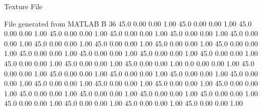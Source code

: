 Texture File

File generated from MATLAB
B 36
   45.0   0.00   0.00  1.00
   45.0   0.00   0.00  1.00
   45.0   0.00   0.00  1.00
   45.0   0.00   0.00  1.00
   45.0   0.00   0.00  1.00
   45.0   0.00   0.00  1.00
   45.0   0.00   0.00  1.00
   45.0   0.00   0.00  1.00
   45.0   0.00   0.00  1.00
   45.0   0.00   0.00  1.00
   45.0   0.00   0.00  1.00
   45.0   0.00   0.00  1.00
   45.0   0.00   0.00  1.00
   45.0   0.00   0.00  1.00
   45.0   0.00   0.00  1.00
   45.0   0.00   0.00  1.00
   45.0   0.00   0.00  1.00
   45.0   0.00   0.00  1.00
   0.0   0.00   0.00  1.00
   45.0   0.00   0.00  1.00
   45.0   0.00   0.00  1.00
   45.0   0.00   0.00  1.00
   45.0   0.00   0.00  1.00
   45.0   0.00   0.00  1.00
   45.0   0.00   0.00  1.00
   45.0   0.00   0.00  1.00
   45.0   0.00   0.00  1.00
   45.0   0.00   0.00  1.00
   45.0   0.00   0.00  1.00
   45.0   0.00   0.00  1.00
   45.0   0.00   0.00  1.00
   45.0   0.00   0.00  1.00
   45.0   0.00   0.00  1.00
   45.0   0.00   0.00  1.00
   45.0   0.00   0.00  1.00
   45.0   0.00   0.00  1.00
